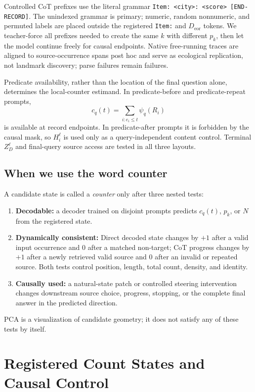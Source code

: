 \documentclass[10pt,twocolumn]{article}
\begin{document}
Controlled CoT prefixes use the literal grammar
\texttt{Item: <city>: <score> [END-RECORD]}. The unindexed grammar is primary; numeric, random
nonnumeric, and permuted labels are placed outside the registered \texttt{Item:} and
$D_{\mathrm{eor}}$ tokens. We teacher-force all prefixes needed to create the same $k$ with
different $p_k$, then let the model continue freely for causal endpoints. Native free-running
traces are aligned to source-occurrence spans post hoc and serve as ecological replication, not
landmark discovery; parse failures remain failures.

Predicate availability, rather than the location of the final question alone, determines the
local-counter estimand. In predicate-before and predicate-repeat prompts,
\[
 c_q(t)=\sum_{i:e_i\leq t}\psi_q(R_i)
\]
is available at record endpoints. In predicate-after prompts it is forbidden by the causal
mask, so $H_i^\ell$ is used only as a query-independent content control. Terminal $Z_D^\ell$
and final-query source access are tested in all three layouts.

\subsection{When we use the word counter}
A candidate state is called a \emph{counter} only after three nested tests:
\begin{enumerate}
  \item \textbf{Decodable:} a decoder trained on disjoint prompts predicts $c_q(t)$, $p_k$, or
  $N$ from the registered state.
  \item \textbf{Dynamically consistent:} Direct decoded state changes by $+1$ after a valid
  input occurrence and $0$ after a matched non-target; CoT progress changes by $+1$ after a
  newly retrieved valid source and $0$ after an invalid or repeated source. Both tests control
  position, length, total count, density, and identity.
  \item \textbf{Causally used:} a natural-state patch or controlled steering intervention changes
  downstream source choice, progress, stopping, or the complete final answer in the predicted
  direction.
\end{enumerate}
PCA is a visualization of candidate geometry; it does not satisfy any of these tests by itself.

\section{Registered Count States and Causal Control}
\end{document}
